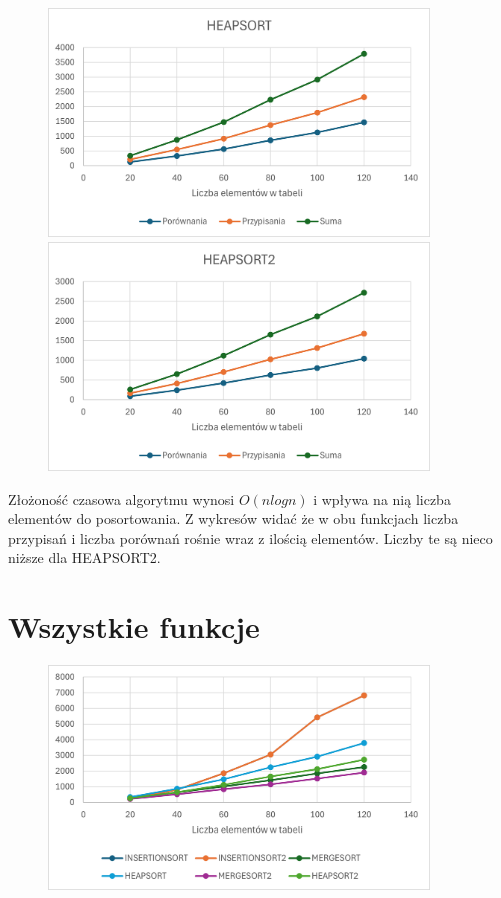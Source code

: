 \documentclass{article}
\begin{document}
	\begin{figure}[H]
		\centering
		\includegraphics[width=0.9\textwidth]{HEAP1.png}
		\includegraphics[width=0.9\textwidth]{HEAP2.png}
	\end{figure}
	
	
	Złożoność czasowa algorytmu wynosi \(O(nlogn)\) i wpływa na nią liczba elementów do posortowania. Z wykresów widać że w obu funkcjach liczba przypisań i liczba porównań rośnie wraz z ilością elementów. Liczby te są nieco niższe dla HEAPSORT2. 
	
	\newpage
	\section*{Wszystkie funkcje}
	\begin{figure}[H]
		\centering
		\includegraphics[width=0.9\textwidth]{Wszystko.png}
	\end{figure}
	
\end{document}
